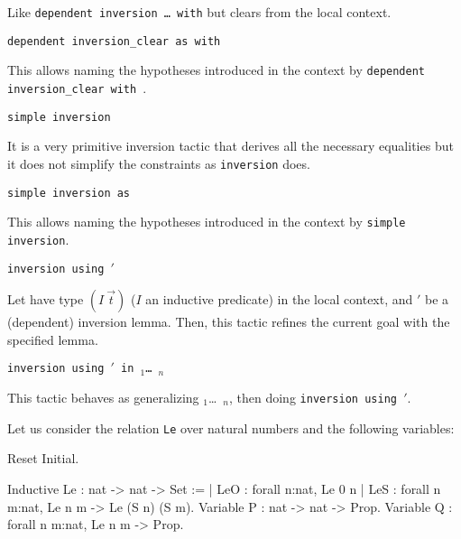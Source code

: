 \begin{coq_example*}
\begin{Variants}
  Like \texttt{dependent inversion \dots\ with} but clears {\ident} from
  the local context.

\item {}
  \texttt{dependent inversion\_clear {\ident} as
  {\intropattern} with \term}

  This allows naming the hypotheses introduced in the context by
  \texttt{dependent inversion\_clear {\ident} with \term}.

\item {} \texttt{simple inversion \ident}

  It is a very primitive inversion tactic that derives all the necessary
  equalities  but it does not simplify the  constraints as
  \texttt{inversion} does.

\item {} \texttt{simple inversion
  {\ident} as \intropattern}

  This allows naming the hypotheses introduced in the context by
  \texttt{simple inversion}.

\item {} \texttt{inversion {\ident}
  using \ident$'$}

  Let {\ident} have type $(I~\vec{t})$ ($I$ an inductive
  predicate) in the local context, and \ident$'$ be a (dependent) inversion
  lemma. Then, this tactic refines the current goal with the specified
  lemma.

\item {} \texttt{inversion
  {\ident} using \ident$'$ in \ident$_1$\dots\ \ident$_n$}

  This tactic behaves as generalizing \ident$_1$\dots\ \ident$_n$,
  then doing \texttt{inversion {\ident} using \ident$'$}.

\end{Variants}

\firstexample
{}
\label{inversion-examples}

Let us consider the relation \texttt{Le} over natural numbers and the
following variables:

\begin{coq_eval}
Reset Initial.
\end{coq_eval}

\begin{coq_example*}
Inductive Le : nat -> nat -> Set :=
  | LeO : forall n:nat, Le 0 n
  | LeS : forall n m:nat, Le n m -> Le (S n) (S m).
Variable P : nat -> nat -> Prop.
Variable Q : forall n m:nat, Le n m -> Prop.
\end{coq_example*}


\end{coq_example*}
